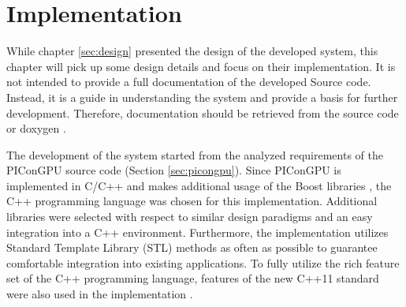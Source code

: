 \chapter{Implementation}
\label{sec:implementation}


While chapter \ref{sec:design} presented the design of the developed
system, this chapter will pick up some design details and focus on
their implementation.  It is not intended to provide a full
documentation of the developed Source code. Instead, it is a
guide in understanding the system and provide a basis for further
development. Therefore, documentation should be retrieved from the
source code or doxygen \cite{ref:doxygen}.

The development of the system started from the analyzed requirements
of the PIConGPU source code (Section \ref{sec:picongpu}). Since
PIConGPU is implemented in C/C++ and makes additional usage of the
Boost libraries \cite{ref:boost}, the C++ programming language was
chosen for this implementation. Additional libraries were selected with
respect to similar design paradigms and an easy
integration into a C++ environment. Furthermore, the implementation
utilizes Standard Template Library (STL) methods as often as
possible to guarantee comfortable integration into existing applications.  To
fully utilize the rich feature set of the C++ programming language,
features of the new C++11 standard were also used in the
implementation \cite{ref:c++11}.


